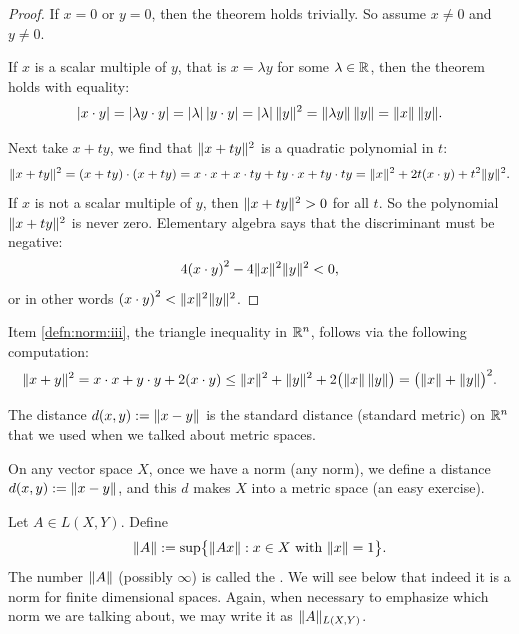 \begin{proof}
If $x=0$ or $y = 0$, then the theorem holds trivially.
So assume $x\not= 0$ and $y \not= 0$.

If $x$ is a scalar multiple of $y$, that is $x = \lambda y$ for some
$\lambda \in {\mathbb{R}}$, then the theorem holds with equality:
\begin{equation*}
\lvert { x \cdot y } \rvert =
\lvert {\lambda y \cdot y} \rvert = \lvert {\lambda} \rvert \, \lvert {y\cdot y} \rvert =
\lvert {\lambda} \rvert \, \lVert {y} \rVert^2 = \lVert {\lambda y} \rVert \, \lVert {y} \rVert
= \lVert {x} \rVert \, \lVert {y} \rVert .
\end{equation*}

Next take $x+ty$, we find that
$\lVert {x+ty} \rVert^2$ is a quadratic polynomial in $t$:
\begin{equation*}
\lVert {x+ty} \rVert^2 =
(x+ty) \cdot (x+ty) =
x \cdot x + x \cdot ty + ty \cdot x + ty \cdot ty
=
\lVert {x} \rVert^2 + 2t(x \cdot y) + t^2 \lVert {y} \rVert^2 .
\end{equation*}
If $x$ is not a scalar multiple of $y$, then 
$\lVert {x+ty} \rVert^2 > 0$ for all $t$.  So the polynomial $\lVert {x+ty} \rVert^2$
is never zero.
Elementary algebra says that the discriminant must be negative:
\begin{equation*}
4 {(x \cdot y)}^2 - 4 \lVert {x} \rVert^2\lVert {y} \rVert^2 < 0,
\end{equation*}
or in other words ${(x \cdot y)}^2 < \lVert {x} \rVert^2\lVert {y} \rVert^2$.
\end{proof}

Item \ref{defn:norm:iii}, the triangle inequality in ${\mathbb{R}}^n$,
follows via the following computation:
\begin{equation*}
\lVert {x+y} \rVert^2 
=
x \cdot x + y \cdot y + 2 (x \cdot y)
\leq
\lVert {x} \rVert^2 + \lVert {y} \rVert^2 + 2 \bigl(\lVert {x} \rVert \,\lVert {y} \rVert\bigr)
=
{\bigl(\lVert {x} \rVert + \lVert {y} \rVert\bigr)}^2 .
\end{equation*}

The distance
$d(x,y) := \lVert {x-y} \rVert$ is the standard
distance (standard metric) on ${\mathbb{R}}^n$ that
we used when we talked about metric spaces.

On any vector space $X$, once we
have a norm (any norm),
we define a distance $d(x,y) := \lVert {x-y} \rVert$, and this
$d$ makes $X$ into
a metric space (an easy exercise).

\begin{defn}
Let $A \in L(X,Y)$.  Define
\begin{equation*}
\lVert {A} \rVert :=
\sup \bigl\{ \lVert {Ax} \rVert : x \in X ~ \text{with} ~ \lVert {x} \rVert = 1 \bigr\} .
\end{equation*}
The number $\lVert {A} \rVert$ (possibly $\infty$)
is called the \emph{}.  We will see below
that indeed it is a norm for finite dimensional spaces.
Again, when necessary to emphasize which norm we are talking about, we may
write it as $\lVert {A} \rVert_{L(X,Y)}$.
\end{defn}

